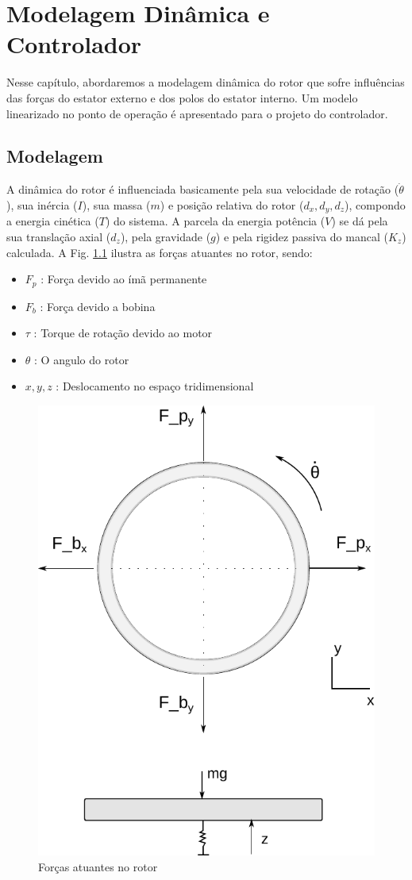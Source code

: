 \pagestyle{empty}
\cleardoublepage
\pagestyle{fancy}

\chapter{Modelagem Dinâmica e Controlador} \label{Cap:Modelagem:Dinamica}

 Nesse capítulo, abordaremos a modelagem dinâmica do rotor que sofre influências das forças do estator externo e dos polos do estator interno. Um modelo linearizado no ponto de operação é apresentado para o projeto do controlador.
 
\section{Modelagem}

A dinâmica do rotor é influenciada basicamente pela sua velocidade de rotação ($\dot{\theta}$), sua inércia ($I$), sua massa ($m$) e posição relativa do rotor ($d_x,d_y,d_z$), compondo a energia cinética ($T$) do sistema. A parcela da energia potência ($V$) se dá pela sua translação axial ($d_z$), pela gravidade ($g$) e pela rigidez passiva do mancal ($K_z$) calculada. A Fig. \ref{fig:modelo:forcas} ilustra as forças atuantes no rotor, sendo:

 \begin{itemize}
 	\item $F_p$ : Força devido ao ímã permanente
 	\item $F_b$ : Força devido a bobina
 	\item $\tau$ : Torque de rotação devido ao motor
 	\item $\theta$ : O angulo do rotor
 	\item $x,y,z$ : Deslocamento no espaço tridimensional
 \end{itemize}

 \begin{figure}[th]
 	\centering
 	\includegraphics[width=0.7\linewidth]{../Figs/Modelagem/forcas}
 	\caption{Forças atuantes no rotor}
 	\label{fig:modelo:forcas}
 \end{figure}
 
